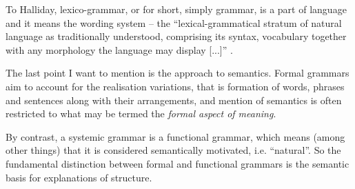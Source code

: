     
    \begin{definition}\label{def:grammar-halliday}
    	To Halliday, lexico-grammar, or for short, simply grammar, is a part of language and it means the wording system -- the ``lexical-grammatical stratum of natural language as traditionally understood, comprising its syntax, vocabulary together with any morphology the language may display [...]'' \citep[369]{Halliday2002}.
    \end{definition}
    

    The last point I want to mention is the approach to semantics. Formal grammars aim to account for the realisation variations, that is formation of words, phrases and sentences along with their arrangements, and mention of semantics is often restricted to what may be termed the \textit{formal aspect of meaning}. 

    By contrast, a systemic grammar is a functional grammar, which means (among other things) that it is considered semantically motivated, i.e. ``natural''. 
    So the fundamental distinction between formal and functional grammars is the semantic basis for explanations of structure. 


